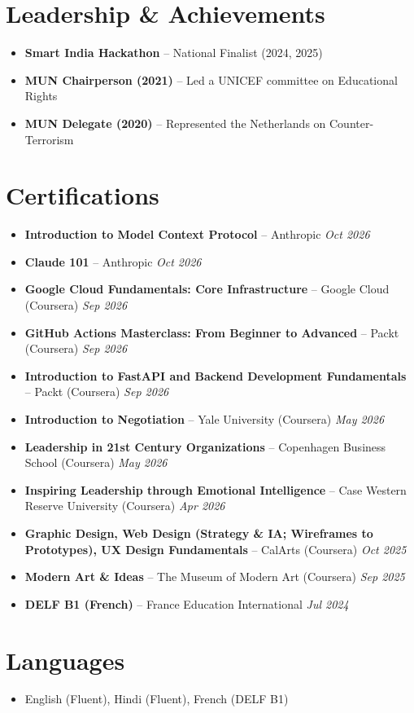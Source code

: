 \documentclass[10pt,a4paper]{article}
\newcommand{\cert}[3]{\item \textbf{#1} -- #2 \hfill \textit{#3}}
\begin{document}
\section*{Leadership \& Achievements}
\begin{itemize}
  \item \textbf{Smart India Hackathon} -- National Finalist (2024, 2025)
  \item \textbf{MUN Chairperson (2021)} -- Led a UNICEF committee on Educational Rights
  \item \textbf{MUN Delegate (2020)} -- Represented the Netherlands on Counter-Terrorism
\end{itemize}

\section*{Certifications}
\begin{itemize}[leftmargin=1.1em]
  \cert{Introduction to Model Context Protocol}{Anthropic}{Oct 2026}
  \cert{Claude 101}{Anthropic}{Oct 2026}
  \cert{Google Cloud Fundamentals: Core Infrastructure}{Google Cloud (Coursera)}{Sep 2026}
  \cert{GitHub Actions Masterclass: From Beginner to Advanced}{Packt (Coursera)}{Sep 2026}
  \cert{Introduction to FastAPI and Backend Development Fundamentals}{Packt (Coursera)}{Sep 2026}
  \cert{Introduction to Negotiation}{Yale University (Coursera)}{May 2026}
  \cert{Leadership in 21st Century Organizations}{Copenhagen Business School (Coursera)}{May 2026}
  \cert{Inspiring Leadership through Emotional Intelligence}{Case Western Reserve University (Coursera)}{Apr 2026}
  \cert{Graphic Design, Web Design (Strategy \& IA; Wireframes to Prototypes), UX Design Fundamentals}{CalArts (Coursera)}{Oct 2025}
  \cert{Modern Art \& Ideas}{The Museum of Modern Art (Coursera)}{Sep 2025}
  \cert{DELF B1 (French)}{France Education International}{Jul 2024}
\end{itemize}

\section*{Languages}
\begin{itemize}
  \item English (Fluent), Hindi (Fluent), French (DELF B1)
\end{itemize}
\end{document}
